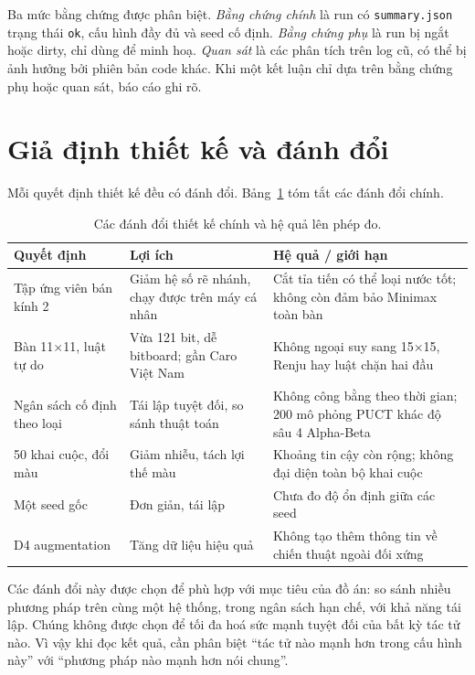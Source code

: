 Ba mức bằng chứng được phân biệt. \emph{Bằng chứng chính} là run có \texttt{summary.json} trạng
thái \texttt{ok}, cấu hình đầy đủ và seed cố định. \emph{Bằng chứng phụ} là run bị ngắt hoặc
dirty, chỉ dùng để minh hoạ. \emph{Quan sát} là các phân tích trên log cũ, có thể bị ảnh hưởng
bởi phiên bản code khác. Khi một kết luận chỉ dựa trên bằng chứng phụ hoặc quan sát, báo cáo
ghi rõ.

\section{Giả định thiết kế và đánh đổi}
\label{sec:pp-gia-dinh}
Mỗi quyết định thiết kế đều có đánh đổi. Bảng~\ref{tab:pp-danh-doi} tóm tắt các đánh đổi chính.

\begin{table}[H]
  \centering\small
  \caption{Các đánh đổi thiết kế chính và hệ quả lên phép đo.}
  \label{tab:pp-danh-doi}
  \begin{tabularx}{\textwidth}{@{}p{} X X@{}}
    \toprule
    \textbf{Quyết định} & \textbf{Lợi ích} & \textbf{Hệ quả / giới hạn} \\
    \midrule
    Tập ứng viên bán kính 2 & Giảm hệ số rẽ nhánh, chạy được trên máy cá nhân & Cắt tỉa tiến có thể loại nước tốt; không còn đảm bảo Minimax toàn bàn \\
    Bàn 11×11, luật tự do & Vừa 121 bit, dễ bitboard; gần Caro Việt Nam & Không ngoại suy sang 15×15, Renju hay luật chặn hai đầu \\
    Ngân sách cố định theo loại & Tái lập tuyệt đối, so sánh thuật toán & Không công bằng theo thời gian; 200 mô phỏng PUCT khác độ sâu 4 Alpha-Beta \\
    50 khai cuộc, đổi màu & Giảm nhiễu, tách lợi thế màu & Khoảng tin cậy còn rộng; không đại diện toàn bộ khai cuộc \\
    Một seed gốc & Đơn giản, tái lập & Chưa đo độ ổn định giữa các seed \\
    D4 augmentation & Tăng dữ liệu hiệu quả & Không tạo thêm thông tin về chiến thuật ngoài đối xứng \\
    \bottomrule
  \end{tabularx}
\end{table}

Các đánh đổi này được chọn để phù hợp với mục tiêu của đồ án: so sánh nhiều phương pháp trên
cùng một hệ thống, trong ngân sách hạn chế, với khả năng tái lập. Chúng không được chọn để tối
đa hoá sức mạnh tuyệt đối của bất kỳ tác tử nào. Vì vậy khi đọc kết quả, cần phân biệt ``tác tử
nào mạnh hơn trong cấu hình này'' với ``phương pháp nào mạnh hơn nói chung''.

